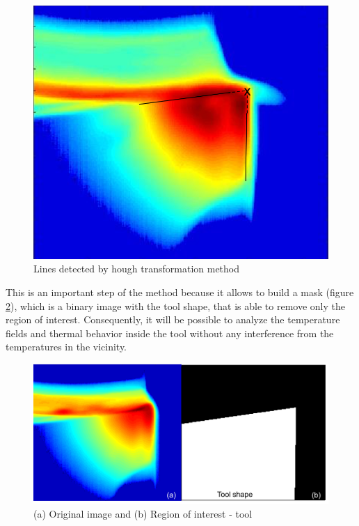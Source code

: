 			\begin{figure}[H]
			\centering
			\captionsetup{justification=centering}
			\includegraphics[scale = 0.6]{Imagens/hough.png}
			\caption{Lines detected by hough transformation method}
			\label{fig:hough}
			\end{figure}

			This is an important step of the method because it allows to build a mask (figure \ref{fig:mask}), which is a binary image with the tool shape, that is able to remove only the region of interest. Consequently, it will be possible to analyze the temperature fields and thermal behavior inside the tool without any interference from the temperatures in the vicinity.

			\begin{figure}[H]
			\centering
			\captionsetup{justification=centering}
			\includegraphics[scale = 0.5]{Imagens/mask.png}
			\caption{(a) Original image and (b) Region of interest - tool}
			\label{fig:mask}
			\end{figure}

